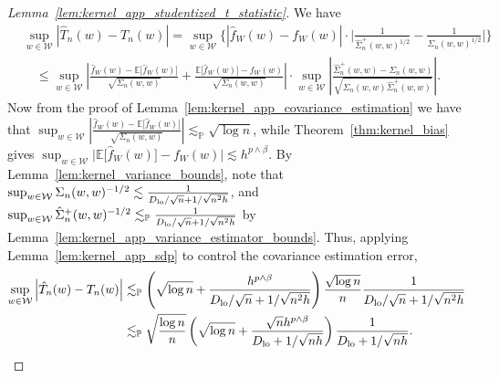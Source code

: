 \documentclass[11pt,lof]{puthesis}
\renewcommand{\P}{\ensuremath{\mathbb{P}}}
\newcommand{\E}{\ensuremath{\mathbb{E}}}
\newcommand{\cW}{\ensuremath{\mathcal{W}}}
\newcommand{\Dl}{\ensuremath{D_{\textup{lo}}}}
\theoremstyle{break}
\theoremstyle{proof}
\newtheorem{proof}{Proof}
\begin{document}
\begin{proof}[Lemma~\ref{lem:kernel_app_studentized_t_statistic}]
%
We have
%
\begin{align*}
&\sup_{w \in \cW}
\left| \hat T_n(w) - T_n(w) \right|
=
\sup_{w \in \cW}
\bigg\{
\left|
\hat f_W(w) - f_W(w)
\right|
\cdot
\bigg|
\frac{1}
{\hat\Sigma_n^+(w,w)^{1/2}}
-
\frac{1}{\Sigma_n(w,w)^{1/2}}
\bigg|
\bigg\} \\
&\quad\leq
\sup_{w \in \cW}
\left|
\frac{\hat f_W(w) - \E\big[\hat f_W(w)\big]}
{\sqrt{\Sigma_n(w,w)}}
+ \frac{\E\big[\hat f_W(w)\big] - f_W(w)}
{\sqrt{\Sigma_n(w,w)}}
\right|
\cdot \sup_{w \in \cW}
\left|
\frac{\hat\Sigma_n^+(w,w) - \Sigma_n(w,w)}
{\sqrt{\Sigma_n(w,w) \hat\Sigma_n^+(w,w)}}
\right|.
\end{align*}
%
Now from the proof of Lemma~\ref{lem:kernel_app_covariance_estimation} we
have that
$\sup_{w \in \cW} \left|
\frac{\hat f_W(w) - \E\big[\hat f_W(w)\big]}
{\sqrt{\Sigma_n(w,w)}} \right|
\lesssim_\P \sqrt{\log n}$,
while Theorem~\ref{thm:kernel_bias} gives
$\sup_{w \in \cW} \big| \E\big[\hat f_W(w)\big] - f_W(w) \big|
\lesssim h^{p \wedge \beta}$.
By Lemma~\ref{lem:kernel_variance_bounds},
note that
$\sup_{w \in \cW} \Sigma_n(w,w)^{-1/2}
\lesssim \frac{1}{\Dl/\sqrt{n} + 1/\sqrt{n^2h}}$, and
$\sup_{w \in \cW} \hat \Sigma_n^+(w,w)^{-1/2}
\lesssim_\P \frac{1}{\Dl/\sqrt{n} + 1/\sqrt{n^2h}}$
by Lemma~\ref{lem:kernel_app_variance_estimator_bounds}.
Thus, applying Lemma~\ref{lem:kernel_app_sdp} to control the
covariance estimation error,
%
\begin{align*}
\sup_{w \in \cW}
\left| \hat T_n(w) - T_n(w) \right|
&\lesssim_\P
\left(
\sqrt{\log n} + \frac{h^{p \wedge \beta}}{\Dl/\sqrt{n} + 1/\sqrt{n^2h}}
\right)
\frac{\sqrt{\log n}}{n}
\frac{1}{\Dl/\sqrt{n} + 1/\sqrt{n^2h}} \\
&\lesssim_\P
\sqrt{\frac{\log n}{n}}
\left(
\sqrt{\log n} + \frac{\sqrt n h^{p \wedge \beta}}
{\Dl + 1/\sqrt{n h}}
\right)
\frac{1}{\Dl + 1/\sqrt{n h}}.
\end{align*}
\end{proof}
\end{document}
